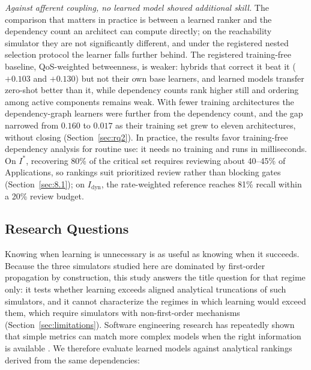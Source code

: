 \documentclass[preprint,3p]{elsarticle}
\begin{document}
\emph{Against afferent coupling, no learned model showed additional skill.} The comparison that matters in practice is between a learned ranker and the dependency count an architect can compute directly; on the reachability simulator they are not significantly different, and under the registered nested selection protocol the learner falls further behind. The registered training-free baseline, QoS-weighted betweenness, is weaker: hybrids that correct it beat it ($+0.103$ and $+0.130$) but not their own base learners, and learned models transfer zero-shot better than it, while dependency counts rank higher still and ordering among active components remains weak. With fewer training architectures the dependency-graph learners were further from the dependency count, and the gap narrowed from $0.160$ to $0.017$ as their training set grew to eleven architectures, without closing (Section~\ref{sec:rq2}). In practice, the results favor training-free dependency analysis for routine use: it needs no training and runs in milliseconds. On $I^*$, recovering 80\% of the critical set requires reviewing about 40--45\% of Applications, so rankings suit prioritized review rather than blocking gates (Section~\ref{sec:8.1}); on $I_{\text{dyn}}$, the rate-weighted reference reaches 81\% recall within a 20\% review budget.

\subsection{Research Questions}
\label{sec:1.4}

Knowing when learning is unnecessary is as useful as knowing when it succeeds. Because the three simulators studied here are dominated by first-order propagation by construction, this study answers the title question for that regime only: it tests whether learning exceeds aligned analytical truncations of such simulators, and it cannot characterize the regimes in which learning would exceed them, which require simulators with non-first-order mechanisms (Section~\ref{sec:limitations}). Software engineering research has repeatedly shown that simple metrics can match more complex models when the right information is available \cite{zimmermann2008predicting,premraj2011network,hellendoorn2017deep,errica2020fair}. We therefore evaluate learned models against analytical rankings derived from the same dependencies:
\end{document}
